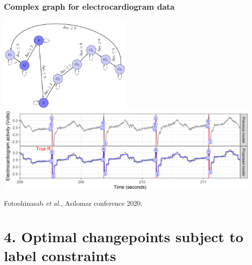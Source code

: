 \documentclass{beamer}
\begin{document}
\begin{frame}
  \frametitle{Complex graph for electrocardiogram data}
  \includegraphics[width=0.5\textwidth]{gfpop-ecg-graph}
  \includegraphics[width=\textwidth]{gfpop-ecg-data}

  Fotoohinasab \emph{et al.}, Asilomar conference 2020.

\end{frame}

\section{4. Optimal changepoints subject to label constraints}
\end{document}
